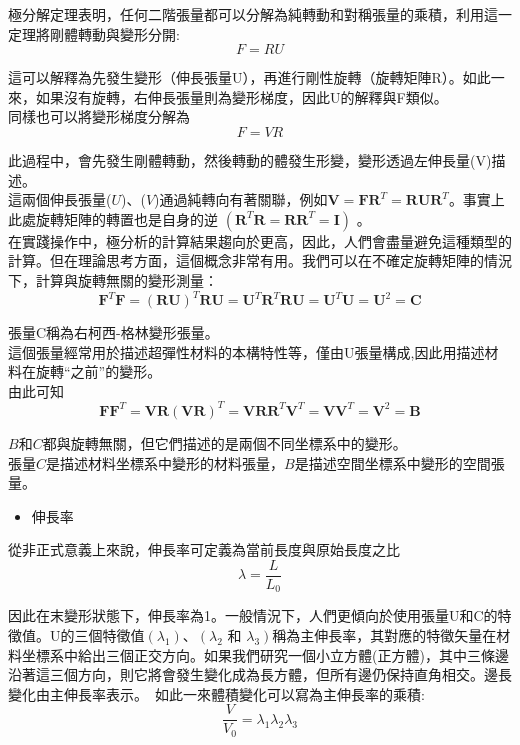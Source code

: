 極分解定理表明，任何二階張量都可以分解為純轉動和對稱張量的乘積，利用這一定理將剛體轉動與變形分開:\
$$F=R U$$

這可以解釋為先發生變形（伸長張量U），再進行剛性旋轉（旋轉矩陣R）。如此一來，如果沒有旋轉，右伸長張量則為變形梯度，因此U的解釋與F類似。\\

同樣也可以將變形梯度分解為\
$$F=V R$$

此過程中，會先發生剛體轉動，然後轉動的體發生形變，變形透過左伸長量(V)描述。\\

這兩個伸長張量($U$)、($V$)通過純轉向有著關聯，例如$\mathbf{V}=\mathbf{F R}^T=\mathbf{R} \mathbf{U} \mathbf{R}^T$。事實上此處旋轉矩陣的轉置也是自身的逆 $\left(\mathbf{R}^T \mathbf{R}=\mathbf{R R}^T=\mathbf{I}\right)$ 。\\

在實踐操作中，極分析的計算結果趨向於更高，因此，人們會盡量避免這種類型的計算。但在理論思考方面，這個概念非常有用。我們可以在不確定旋轉矩陣的情況下，計算與旋轉無關的變形測量：\
$$\mathbf{F}^T \mathbf{F}=(\mathbf{R U})^T \mathbf{R} \mathbf{U}=\mathbf{U}^T \mathbf{R}^T \mathbf{R} \mathbf{U}=\mathbf{U}^T \mathbf{U}=\mathbf{U}^2=\mathbf{C}$$

張量C稱為右柯西-格林變形張量。\\

這個張量經常用於描述超彈性材料的本構特性等，僅由U張量構成,因此用描述材料在旋轉“之前”的變形。\\

由此可知\
$$\mathbf{F} \mathbf{F}^T=\mathbf{V R}(\mathbf{V R})^T=\mathbf{V R R}^T \mathbf{V}^T=\mathbf{V} \mathbf{V}^T=\mathbf{V}^2=\mathbf{B}$$

$B$和$C$都與旋轉無關，但它們描述的是兩個不同坐標系中的變形。\\

張量$C$是描述材料坐標系中變形的材料張量，$B$是描述空間坐標系中變形的空間張量。\\

\begin{itemize}
\item 伸長率
\end{itemize}
從非正式意義上來說，伸長率可定義為當前長度與原始長度之比\
$$\lambda=\frac{L}{L_0}$$

因此在末變形狀態下，伸長率為1。一般情況下，人們更傾向於使用張量U和C的特徵值。U的三個特徵值$\left(\lambda_1\right)$、$\left(\lambda_2\right.$ 和 $\left.\lambda_3\right)$稱為主伸長率，其對應的特徵矢量在材料坐標系中給出三個正交方向。如果我們研究一個小立方體(正方體)，其中三條邊沿著這三個方向，則它將會發生變化成為長方體，但所有邊仍保持直角相交。邊長變化由主伸長率表示。\
如此一來體積變化可以寫為主伸長率的乘積:\
$$\frac{V}{V_0}=\lambda_1 \lambda_2 \lambda_3$$\

